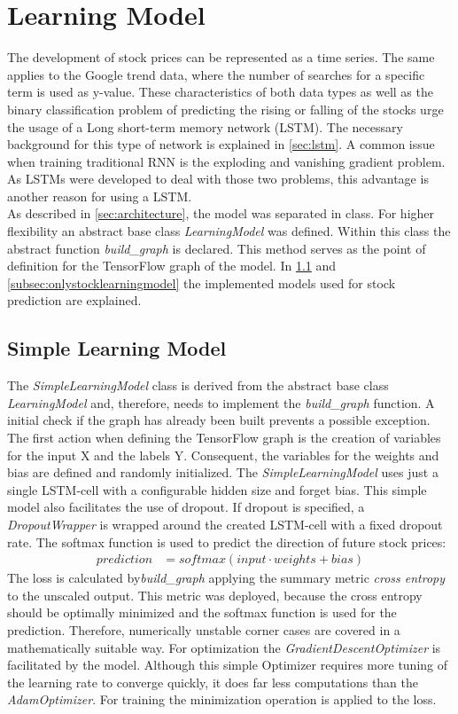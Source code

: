 \section{Learning Model}
\label{sec:model}
The development of stock prices can be represented as a time series. The same applies to the Google trend data, where the number of searches for a specific term is used as y-value. These characteristics of both data types as well as the binary classification problem of predicting the rising or falling of the stocks urge the usage of a Long short-term memory network (LSTM). The necessary background for this type of network is explained in \ref{sec:lstm}. A common issue when training traditional RNN is the exploding and vanishing gradient problem. As LSTMs were developed to deal with those two problems, this advantage is another reason for using a LSTM. 
\\
As described in \ref{sec:architecture}, the model was separated in class. For higher flexibility an abstract base class \textit{LearningModel} was defined. Within this class the abstract function \textit{build\_graph} is declared. This method serves as the point of definition for the TensorFlow graph of the model. In \ref{subsec:simplelearningmodel} and \ref{subsec:onlystocklearningmodel} the implemented models used for stock prediction are explained. 

\subsection{Simple Learning Model}
\label{subsec:simplelearningmodel}
The \textit{SimpleLearningModel} class is derived from the abstract base class \textit{LearningModel} and, therefore, needs to implement the \textit{build\_graph} function. A initial check if the graph has already been built prevents a possible exception. The first action when defining the TensorFlow graph is the creation of variables for the input X and the labels Y. Consequent, the variables for the weights and bias are defined and randomly initialized. The \textit{SimpleLearningModel} uses just a single LSTM-cell with a configurable hidden size and forget bias. This simple model also facilitates the use of dropout. If dropout is specified, a \textit{DropoutWrapper} is wrapped around the created LSTM-cell with a fixed dropout rate. The softmax function is used to predict the direction of future stock prices:
\begin{align}
prediction &= softmax(input \cdot weights + bias)
\end{align}
The loss is calculated by\textit{build\_graph} applying the summary metric \textit{cross entropy} to the unscaled output. This metric was deployed, because the cross entropy should be optimally minimized and the softmax function is used for the prediction. Therefore, numerically unstable corner cases are covered in a mathematically suitable way. For optimization the \textit{GradientDescentOptimizer} is facilitated by the model. Although this simple Optimizer requires more tuning of the learning rate to converge quickly, it does far less computations than the \textit{AdamOptimizer}. For training the minimization operation is applied to the loss. 

